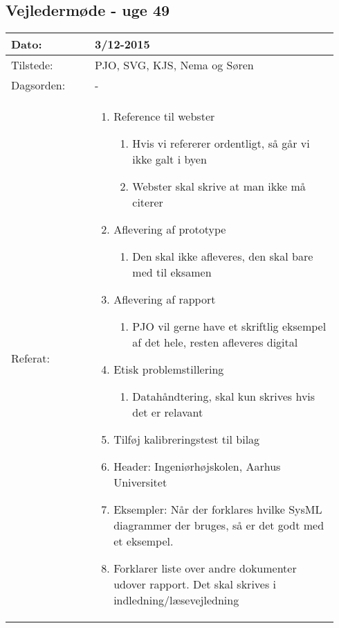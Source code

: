 	\subsection{Vejledermøde - uge 49} \label{app:vejlederuge49}
	\begin{longtable}{|p{0.24\linewidth}|p{0.7\linewidth}|}
		\hline
		Dato: & 3/12-2015\\ \hline
		Tilstede: & PJO, SVG, KJS, Nema og Søren\\ \hline
		Dagsorden: & - \\ \hline
		Referat: & 
		\begin{enumerate}
			\item Reference til webster 
			\begin{enumerate}
				\item Hvis vi refererer ordentligt, så går vi ikke galt i byen 
				\item Webster skal skrive at man ikke må citerer
			\end{enumerate}
			\item Aflevering af prototype
			\begin{enumerate}
				\item Den skal ikke afleveres, den skal bare med til eksamen
			\end{enumerate}
			\item Aflevering af rapport
			\begin{enumerate}
				\item PJO vil gerne have et skriftlig eksempel af det hele, resten afleveres digital
			\end{enumerate}
			\item Etisk problemstillering
			\begin{enumerate}
				\item Datahåndtering, skal kun skrives hvis det er relavant
			\end{enumerate}
			\item Tilføj kalibreringstest til bilag
			\item Header: Ingeniørhøjskolen, Aarhus Universitet
			\item Eksempler: Når der forklares hvilke SysML diagrammer der bruges, så er det godt med et eksempel. 
			\item Forklarer liste over andre dokumenter udover rapport. Det skal skrives i indledning/læsevejledning
		\end{enumerate}
		\\ \hline
	\end{longtable}
	
	
